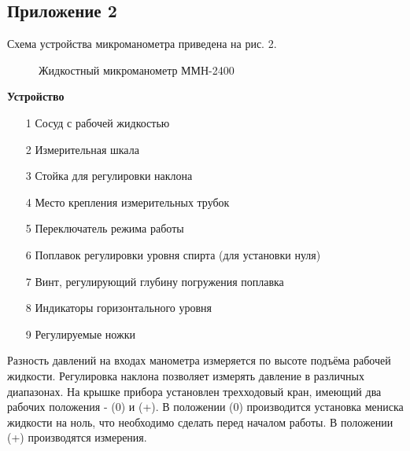 \subsection{Приложение 2} \label{Приложение 2}
Схема устройства микроманометра приведена на рис. 2.
\begin{figure}[ht]
    \label{figure2}
    \caption{Жидкостный микроманометр ММН-2400}
\end{figure}

\textbf{Устройство}
\begin{itemize}
    \item[1] 
    Сосуд с рабочей жидкостью
    \item[2]
    Измерительная шкала
    \item[3]
    Стойка для регулировки наклона
    \item[4]
    Место крепления измерительных трубок
    \item[5] 
    Переключатель режима работы
    \item[6] 
    Поплавок регулировки уровня спирта (для установки нуля)
    \item[7] 
    Винт, регулирующий глубину погружения поплавка
    \item[8] 
    Индикаторы горизонтального уровня
    \item[9] 
    Регулируемые ножки
\end{itemize}

Разность давлений на входах манометра измеряется по высоте подъёма рабочей жидкости. Регулировка
наклона позволяет измерять давление в различных диапазонах. На крышке прибора установлен трехходовый кран, имеющий два рабочих положения - (0) и (+). В положении (0) производится установка мениска жидкости на ноль, что необходимо сделать перед началом работы. В положении (+) производятся измерения.

